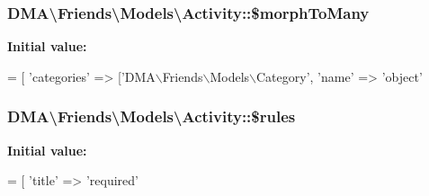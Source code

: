 \subsubsection[{\$morph\+To\+Many}]{\setlength{\rightskip}{0pt plus 5cm}D\+M\+A\textbackslash{}\+Friends\textbackslash{}\+Models\textbackslash{}\+Activity\+::\$morph\+To\+Many}\label{classDMA_1_1Friends_1_1Models_1_1Activity_a5cfb1d646716be755dcdb6ddb3ab16b1}
{\bfseries Initial value\+:}
\begin{DoxyCode}
= [
        \textcolor{stringliteral}{'categories'}    => [\textcolor{stringliteral}{'DMA\(\backslash\)Friends\(\backslash\)Models\(\backslash\)Category'}, 
            \textcolor{stringliteral}{'name'}  => \textcolor{stringliteral}{'object'}
\end{DoxyCode}
\hypertarget{classDMA_1_1Friends_1_1Models_1_1Activity_a0b92e75aa8d92e2d3c9b24f54cd813bc}{}
\subsubsection[{\$rules}]{\setlength{\rightskip}{0pt plus 5cm}D\+M\+A\textbackslash{}\+Friends\textbackslash{}\+Models\textbackslash{}\+Activity\+::\$rules}\label{classDMA_1_1Friends_1_1Models_1_1Activity_a0b92e75aa8d92e2d3c9b24f54cd813bc}
{\bfseries Initial value\+:}
\begin{DoxyCode}
= [ 
        \textcolor{stringliteral}{'title'}             => \textcolor{stringliteral}{'required'}
\end{DoxyCode}
\hypertarget{classDMA_1_1Friends_1_1Models_1_1Activity_a71b85478f20cda144aeffe010364a0f7}{}
